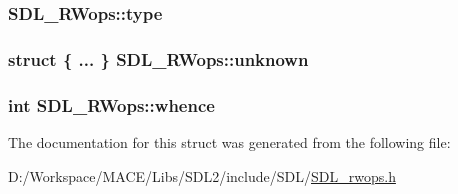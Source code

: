 \subsubsection[{\texorpdfstring{type}{type}}]{ S\+D\+L\+\_\+\+R\+Wops\+::type}\hypertarget{struct_s_d_l___r_wops_a099017bfceaac24ced0e4d08a4e0a023}{}\label{struct_s_d_l___r_wops_a099017bfceaac24ced0e4d08a4e0a023}
\subsubsection[{\texorpdfstring{unknown}{unknown}}]{\setlength{\rightskip}{0pt plus 5cm}struct \{ ... \}   S\+D\+L\+\_\+\+R\+Wops\+::unknown}\hypertarget{struct_s_d_l___r_wops_a5c2ef3288fcf78cc28f1b4b16b32eca1}{}\label{struct_s_d_l___r_wops_a5c2ef3288fcf78cc28f1b4b16b32eca1}
\subsubsection[{\texorpdfstring{whence}{whence}}]{ {\bf int} S\+D\+L\+\_\+\+R\+Wops\+::whence}\hypertarget{struct_s_d_l___r_wops_a95b96dcc6690897bfaf2d059f4378ed2}{}\label{struct_s_d_l___r_wops_a95b96dcc6690897bfaf2d059f4378ed2}


The documentation for this struct was generated from the following file\+:\begin{DoxyCompactItemize}
\item 
D\+:/\+Workspace/\+M\+A\+C\+E/\+Libs/\+S\+D\+L2/include/\+S\+D\+L/\hyperlink{_s_d_l__rwops_8h}{S\+D\+L\+\_\+rwops.\+h}\end{DoxyCompactItemize}
